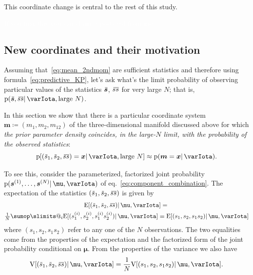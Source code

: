 \documentclass[\ifafour a4paper,12pt,\else a5paper,10pt,\fi%
onecolumn,oneside,article,%
british%
]{memoir}
\makeatletter
\theoremstyle{remark}
\theoremstyle{innote}
\def\sum{\DOTSI\sumop\slimits@}
\newcommand*{\defd}{\coloneqq}
\DeclarePairedDelimiter\clcl{[}{]}
\newcommand*{\pf}{\mathrm{p}}%
\renewcommand*{\|}{\mathpunct{|}}
\newcommand*{\eqn}{eq.}%
\newcommand*{\E}{\mathrm{E}}
\newcommand*{\expeb}{\E\clcl}%
\newcommand*{\widebar}[1]{{\mkern1.5mu\skew{2}\overline{\mkern-1.5mu#1\mkern-1.5mu}\mkern 1.5mu}}
\newcommand*{\yI}{\varIota}
\newcommand*{\ys}{\bm{s}}
\newcommand*{\yso}[1]{\ys^{(#1)}}
\newcommand*{\ysso}[1]{s^{(#1)}}
\newcommand*{\yth}{\bm{\mu}}
\newcommand*{\yt}{\bm{m}}
\newcommand*{\yl}{m_{12}}
\newcommand*{\yav}{\widebar{\ys}}
\newcommand*{\yavv}{\widebar{s}}
\newcommand*{\ycv}{\widebar{ss}}
\newcommand*{\V}{\mathrm{V}}
\newcommand*{\varb}{\V\clcl}%
\makeatother
\begin{document}
This coordinate change is central to the rest of this study.

\textcolor{white}{If you find this you can claim a postcard from me.}

\subsection{New coordinates and their motivation}
\label{sec:new_coords}

Assuming that~\eqref{eq:mean_2ndmom} are sufficient statistics and
therefore using formula~\eqref{eq:predictive_KP}, let's ask what's the
limit probability of observing particular values of the statistics $\yav$,
$\ycv$ for very large $N$; that is, $\pf(\yav,\ycv \| \yI, \text{large } N)$.

In this section we show that there is a particular coordinate system
$\yt \defd (m_1, m_2, \yl)$ of the three-dimensional manifold discussed above
for which \emph{the prior parameter density coincides, in the large-$N$
  limit, with the probability of the observed statistics}:
\begin{equation}
  \label{eq:special_parameter_is_statistics}
  \pf[(\yavv_1,\yavv_2,\ycv)=\bm{x} \| \yI, \text{large $N$}]
  \approx \pf(\yt=\bm{x} \|\yI).
\end{equation}

To see this, consider the parameterized, factorized joint probability
$\pf(\yso{1}, \dotsc, \yso{N} \|\yth, \yI )$ of
\eqn~\eqref{eq:component_combination}. The expectation of the statistics
$(\yavv_1,\yavv_2,\ycv)$ is given by
\begin{multline}
  \label{eq:expect_statistics}
  \expeb{(\yavv_1,\yavv_2,\ycv) \|\yth,\yI} ={}\\
  \tfrac{1}{N} \sum_{i}
  \expeb{(\ysso{i}_1,\ysso{i}_2,\ysso{i}_1 \ysso{i}_2) \|\yth,\yI}
  = \expeb{(s_1,s_2,s_1 s_2) \|\yth,\yI}
\end{multline}
where $(s_1,s_2,s_1 s_2)$ refer to any one of the $N$ observations. The two
equalities come from the properties of the expectation and the factorized
form of the joint probability conditional on $\yth$. From the properties of
the variance we also have
\begin{equation}
  \label{eq:variance_statistics}
  \varb{(\yavv_1,\yavv_2,\ycv) \|\yth,\yI}
  = \frac{1}{N} \varb{(s_1,s_2,s_1 s_2) \|\yth,\yI}.
\end{equation}
\end{document}

